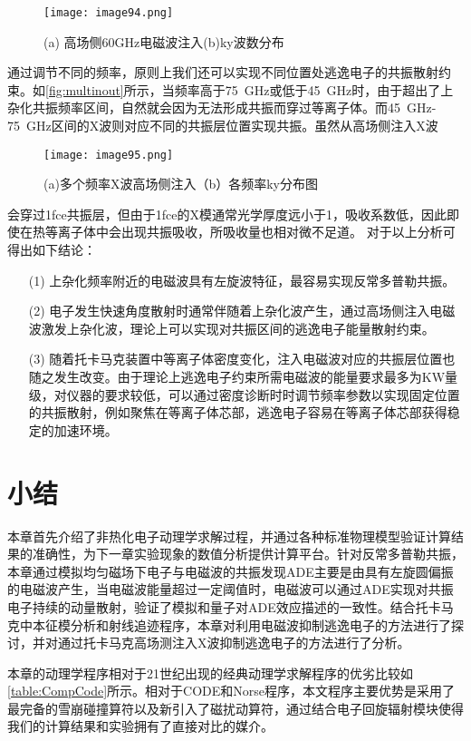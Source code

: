 \begin{figure}[H]
\centering
\texttt{[image: image94.png]}
\caption{\label{fig:inout}(a) 高场侧60GHz电磁波注入(b)ky波数分布
}
\end{figure}

 
通过调节不同的频率，原则上我们还可以实现不同位置处逃逸电子的共振散射约束。如\autoref{fig:multinout}所示，当频率高于75~GHz或低于45~GHz时，由于超出了上杂化共振频率区间，自然就会因为无法形成共振而穿过等离子体。而45~GHz-75~GHz区间的X波则对应不同的共振层位置实现共振。虽然从高场侧注入X波
\begin{figure}
\centering
\texttt{[image: image95.png]}
\caption{\label{fig:multinout}(a)多个频率X波高场侧注入（b）各频率ky分布图
}
\end{figure}
会穿过1fce共振层，但由于1fce的X模通常光学厚度远小于1，吸收系数低，因此即使在热等离子体中会出现共振吸收，所吸收量也相对微不足道。
对于以上分析可得出如下结论：
\begin{itemize}
\item[(1)]
上杂化频率附近的电磁波具有左旋波特征，最容易实现反常多普勒共振。
\item[(2)]
电子发生快速角度散射时通常伴随着上杂化波产生，通过高场侧注入电磁波激发上杂化波，理论上可以实现对共振区间的逃逸电子能量散射约束。
\item[(3)]
随着托卡马克装置中等离子体密度变化，注入电磁波对应的共振层位置也随之发生改变。由于理论上逃逸电子约束所需电磁波的能量要求最多为KW量级，对仪器的要求较低，可以通过密度诊断时时调节频率参数以实现固定位置的共振散射，例如聚焦在等离子体芯部，逃逸电子容易在等离子体芯部获得稳定的加速环境。
\end{itemize}

\section{小结}
本章首先介绍了非热化电子动理学求解过程，并通过各种标准物理模型验证计算结果的准确性，为下一章实验现象的数值分析提供计算平台。针对反常多普勒共振，本章通过模拟均匀磁场下电子与电磁波的共振发现ADE主要是由具有左旋圆偏振的电磁波产生，当电磁波能量超过一定阈值时，电磁波可以通过ADE实现对共振电子持续的动量散射，验证了模拟和量子对ADE效应描述的一致性。结合托卡马克中本征模分析和射线追迹程序，本章对利用电磁波抑制逃逸电子的方法进行了探讨，并对通过托卡马克高场测注入X波抑制逃逸电子的方法进行了分析。
  \par 本章的动理学程序相对于21世纪出现的经典动理学求解程序的优劣比较如\autoref{table:CompCode}所示。相对于CODE和Norse程序，本文程序主要优势是采用了最完备的雪崩碰撞算符以及新引入了磁扰动算符，通过结合电子回旋辐射模块使得我们的计算结果和实验拥有了直接对比的媒介。

